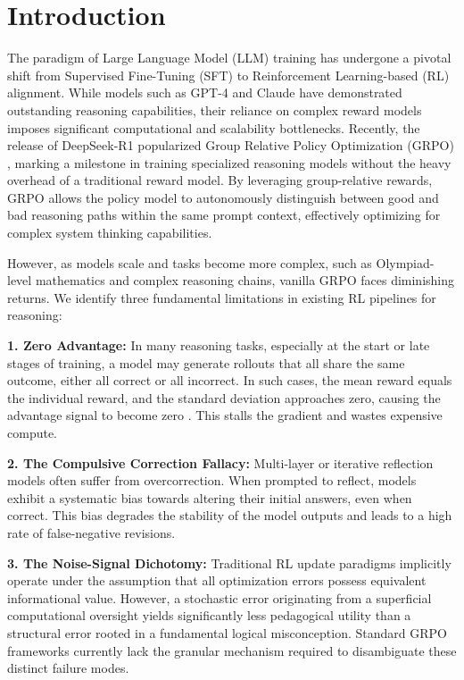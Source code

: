 \section{Introduction}

The paradigm of Large Language Model (LLM) training has undergone a pivotal shift from Supervised Fine-Tuning (SFT)\cite{ouyang2022traininglanguagemodelsfollow} to Reinforcement Learning-based (RL)\cite{Fran_ois_Lavet_2018} alignment. While models such as GPT-4 \cite{Achiam2023GPT4TR} and Claude \cite{TheC3} have demonstrated outstanding reasoning capabilities, their reliance on complex reward models imposes significant computational and scalability bottlenecks. Recently, the release of DeepSeek-R1 popularized Group Relative Policy Optimization (GRPO)\cite{Guo_2025} \cite{shao2024deepseekmathpushinglimitsmathematical}, marking a milestone in training specialized reasoning models without the heavy overhead of a traditional reward model. By leveraging group-relative rewards, GRPO allows the policy model to autonomously distinguish between good and bad reasoning paths within the same prompt context, effectively optimizing for complex system thinking capabilities.

However, as models scale and tasks become more complex, such as Olympiad-level mathematics and complex reasoning chains, vanilla GRPO faces diminishing returns. We identify three fundamental limitations in existing RL pipelines for reasoning:

\textbf{1. Zero Advantage:} In many reasoning tasks, especially at the start or late stages of training, a model may generate rollouts that all share the same outcome, either all correct or all incorrect. In such cases, the mean reward equals the individual reward, and the standard deviation approaches zero, causing the advantage signal to become zero \cite{zhang2026trainlesslearnmore}. This stalls the gradient and wastes expensive compute.

\textbf{2. The Compulsive Correction Fallacy:} Multi-layer \cite{ding2025multilayergrpoenhancingreasoning} or iterative reflection models \cite{madaan2023selfrefineiterativerefinementselffeedback} often suffer from overcorrection. When prompted to reflect, models exhibit a systematic bias towards altering their initial answers, even when correct. This bias degrades the stability of the model outputs and leads to a high rate of false-negative revisions.

\textbf{3. The Noise-Signal Dichotomy:} Traditional RL update paradigms implicitly operate under the assumption that all optimization errors possess equivalent informational value. However, a stochastic error originating from a superficial computational oversight yields significantly less pedagogical utility than a structural error rooted in a fundamental logical misconception. Standard GRPO frameworks currently lack the granular mechanism required to disambiguate these distinct failure modes.

